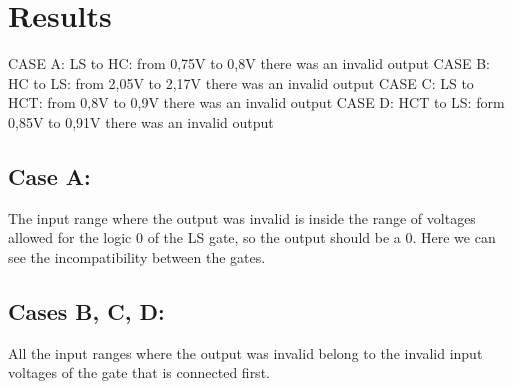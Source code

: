 \section*{Results}

CASE A: LS to HC: from 0,75V to 0,8V there was an invalid output
\newline
CASE B: HC to LS: from 2,05V to 2,17V there was an invalid output
\newline
CASE C: LS to HCT: from 0,8V to 0,9V there was an invalid output
\newline
CASE D: HCT to LS: form 0,85V to 0,91V there was an invalid output
\newline

\subsection*{Case A:}
\newline
The input range where the output was invalid is inside
 the range of voltages allowed for the logic 0 of the LS gate, 
 so the output should be a 0. Here we can see the incompatibility 
 between the gates.
\subsection*{Cases B, C, D:} All the input ranges where the output was invalid
 belong to the invalid input voltages of the gate that is connected 
 first. 

